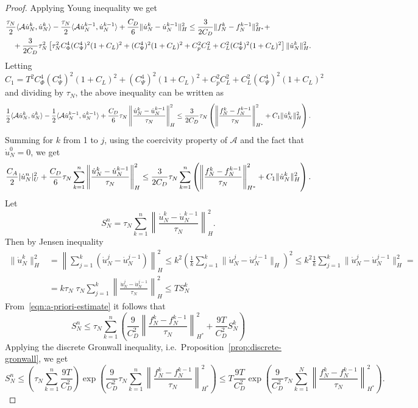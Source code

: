 \documentclass[a4paper,10pt,twoside]{amsbook}
\numberwithin{section}{chapter}
\numberwithin{equation}{chapter}
\theoremstyle{definition}
\DeclarePairedDelimiter{\norm}{\lVert}{\rVert}
\DeclarePairedDelimiter{\dual}{\langle}{\rangle}
\begin{document}
\begin{proof}
Applying Young inequality we get
\[
\begin{multlined}
\frac{\tau_N}{2}\dual{\mathcal{A}\dot u_N^k,\dot u_N^k}-\frac{\tau_N}{2}\dual{\mathcal{A}\dot u_N^{k-1},\dot u_N^{k-1}}+\frac{C_D}{6}\norm{\dot u_N^k-\dot u_N^{k-1}}_H^2\le\frac{3}{2C_D}\norm{f_N^k-f_N^{k-1}}_{H^*}^2+\\+
\frac{3}{2C_D}\tau_N^2\left[\tau_N^2C_\Phi^4(C_\Psi^4)^2(1+C_L)^2+(C_\Psi^4)^2(1+C_L)^2+C_p^2C_L^2+C_L^2(C_\Psi^4)^2(1+C_L)^2\right]\norm{\dot u_N^k}_H^2.
\end{multlined}
\]
Letting
\[
C_1=T^2C_\Phi^4(C_\Psi^4)^2(1+C_L)^2+(C_\Psi^4)^2(1+C_L)^2+C_p^2C_L^2+C_L^2(C_\Psi^4)^2(1+C_L)^2
\]
and dividing by $\tau_N$, the above inequality can be written as
\[
\frac{1}{2}\dual{\mathcal{A}\dot u_N^k,\dot u_N^k}-\frac{1}{2}\dual{\mathcal{A}\dot u_N^{k-1},\dot u_N^{k-1}}+\frac{C_D}{6}\tau_N\left\lVert\frac{\dot u_N^k-\dot u_N^{k-1}}{\tau_N}\right\rVert_H^2\le\frac{3}{2C_D}\tau_N\left(\left\lVert\frac{f_N^k-f_N^{k-1}}{\tau_N}\right\rVert_{H^*}^2+C_1\norm{\dot u_N^k}_H^2\right).
\]
Summing for $k$ from 1 to $j$, using the coercivity property of $\mathcal{A}$ and the fact that $\dot u_N^0=0$, we get
\begin{equation}
\label{eqn:a-priori-estimate}
\frac{C_A}{2}|\dot u_N^n|_U^2+\frac{C_D}{6}\tau_N\sum_{k=1}^n\left\lVert\frac{\dot u_N^k-\dot u_N^{k-1}}{\tau_N}\right\rVert_H^2\le\frac{3}{2C_D}\tau_N\sum_{k=1}^n\left(\left\lVert\frac{f_N^k-f_N^{k-1}}{\tau_N}\right\rVert_{H^*}^2+C_1\norm{\dot u_N^k}_H^2\right).
\end{equation}
Let
\[
S_N^n=\tau_N\sum_{k=1}^n\left\lVert\frac{\dot u_N^k-\dot u_N^{k-1}}{\tau_N}\right\rVert_H^2.
\]
Then by Jensen inequality
\[
\begin{split}
\|\dot{u}_N^k\|_H^2&=\left\|\sum_{j=1}^k(\dot{u}_N^j-\dot{u}_N^{j-1})\right\|_H^2\le k^2\left(\frac{1}{k}\sum_{j=1}^k\|\dot{u}_N^j-\dot{u}_N^{j-1}\|_H\right)^2\le k^2\frac{1}{k}\sum_{j=1}^k\|\dot{u}_N^j-\dot{u}_N^{j-1}\|_H^2=\\
&=k\tau_N\;\tau_N\sum_{j=1}^k\left\|\frac{\dot{u}_N^j-\dot{u}_N^{j-1}}{\tau_N}\right\|_H^2\le TS_N^k
\end{split}
\]
From~\eqref{eqn:a-priori-estimate} it follows that
\[
S_N^n\le\tau_N\sum_{k=1}^n\left(\frac{9}{C_D^2}\left\|\frac{f_N^k-f_N^{k-1}}{\tau_N}\right\|_{H^*}^2+\frac{9T}{C_D^2}S_N^k\right)
\]
Applying the discrete Gronwall inequality, i.e.\ Proposition~\ref{prop:discrete-gronwall}, we get
\[
S_N^n\le\left(\tau_N\sum_{k=1}^n\frac{9T}{C_D^2}\right)\exp\left(\frac{9}{C_D^2}\tau_N\sum_{k=1}^n\left\|\frac{f_N^k-f_N^{k-1}}{\tau_N}\right\|_{H^*}^2\right)\le T\frac{9T}{C_D^2}\exp\left(\frac{9}{C_D^2}\tau_N\sum_{k=1}^N\left\|\frac{f_N^k-f_N^{k-1}}{\tau_N}\right\|_{H^*}^2\right).
\]
\end{proof}
\end{document}
